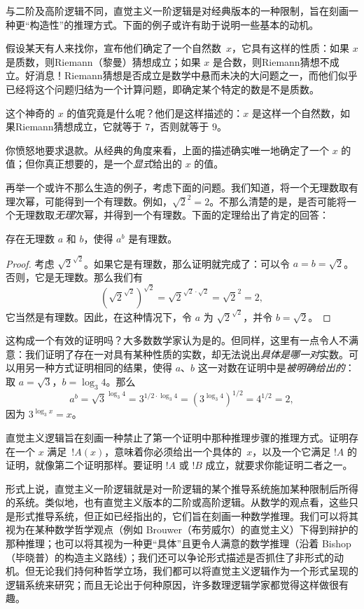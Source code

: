 \documentclass[../../../include/open-logic-section]{subfiles}
\begin{document}


与二阶及高阶逻辑不同，直觉主义一阶逻辑是对经典版本的一种限制，旨在刻画一种更“构造性”的推理方式。下面的例子或许有助于说明一些基本的动机。

假设某天有人来找你，宣布他们确定了一个自然数~$x$，它具有这样的性质：如果 $x$ 是质数，则Riemann（黎曼）猜想成立；如果 $x$ 是合数，则Riemann猜想不成立。好消息！Riemann猜想是否成立是数学中悬而未决的大问题之一，而他们似乎已经将这个问题归结为一个计算问题，即确定某个特定的数是不是质数。

这个神奇的 $x$ 的值究竟是什么呢？他们是这样描述的：$x$ 是这样一个自然数，如果Riemann猜想成立，它就等于 $7$，否则就等于 $9$。

你愤怒地要求退款。从经典的角度来看，上面的描述确实唯一地确定了一个 $x$ 的值；但你真正想要的，是一个\emph{显式}给出的 $x$ 的值。

再举一个或许不那么生造的例子，考虑下面的问题。我们知道，将一个无理数取有理次幂，可能得到一个有理数。例如，$\sqrt{2}^2 = 2$。不那么清楚的是，是否可能将一个无理数取\emph{无理}次幂，并得到一个有理数。下面的定理给出了肯定的回答：

\begin{thm}
存在无理数 $a$ 和 $b$，使得 $a^b$ 是有理数。
\end{thm}

\begin{proof}
考虑 $\sqrt{2}^{\sqrt{2}}$。如果它是有理数，那么证明就完成了：可以令 $a = b = \sqrt{2}$。否则，它是无理数。那么我们有
\[
(\sqrt{2}^{\sqrt{2}})^{\sqrt{2}} = \sqrt{2}^{\sqrt{2} \cdot
  \sqrt{2}} = \sqrt{2}^2 = 2,
\]
它当然是有理数。因此，在这种情况下，令 $a$ 为 $\sqrt{2}^{\sqrt{2}}$，并令 $b = \sqrt 2$。
\end{proof}

这构成一个有效的证明吗？大多数数学家认为是的。但同样，这里有一点令人不满意：我们证明了存在一对具有某种性质的实数，却无法说出\emph{具体是哪一对}实数。可以用另一种方式证明相同的结果，使得 $a$、$b$ 这一对数在证明中是\emph{被明确给出的}：取 $a = \sqrt{3}$，$b = \log_3 4$。那么
\[
a^b = \sqrt{3}^{\log_3 4} = 3^{1/2 \cdot \log_3 4} = (3^{\log_3
  4})^{1/2} = 4^{1/2}= 2,
\]
因为 $3^{\log_3 x} = x$。

直觉主义逻辑旨在刻画一种禁止了第一个证明中那种推理步骤的推理方式。证明存在一个 $x$ 满足~$!A(x)$，意味着你必须给出一个具体的~$x$，以及一个它满足 $!A$ 的证明，就像第二个证明那样。要证明 $!A$ 或 $!B$ 成立，就要求你能证明二者之一。

形式上说，直觉主义一阶逻辑就是对一阶逻辑的某个推导系统施加某种限制后所得的系统。类似地，也有直觉主义版本的二阶或高阶逻辑。从数学的观点看，这些只是形式推导系统，但正如已经指出的，它们旨在刻画一种数学推理。我们可以将其视为在某种数学哲学观点（例如 Brouwer（布劳威尔）的直觉主义）下得到辩护的那种推理；也可以将其视为一种更“具体”且更令人满意的数学推理（沿着 Bishop（毕晓普）的构造主义路线）；我们还可以争论形式描述是否抓住了非形式的动机。但无论我们持何种哲学立场，我们都可以将直觉主义逻辑作为一个形式呈现的逻辑系统来研究；而且无论出于何种原因，许多数理逻辑学家都觉得这样做很有趣。
\end{document}
